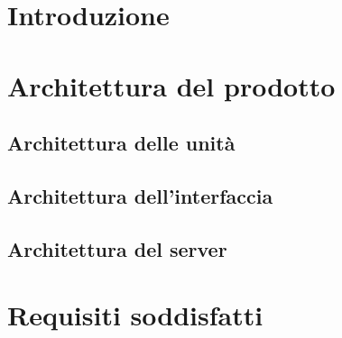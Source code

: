 \documentclass[]{article}
\begin{document}
	
	\newpage
	\tableofcontents
	\newpage
	\listoffigures
	\listoftables
	\newpage

	\section{Introduzione}
	
	\newpage

	\section{Architettura del prodotto}
	
	\subsection{Architettura delle unità}
	
	\newpage
	
	\subsection{Architettura dell'interfaccia}
	
	\newpage
	
	\subsection{Architettura del server}
	
	\newpage
	
	\section{Requisiti soddisfatti}
	
\end{document}
